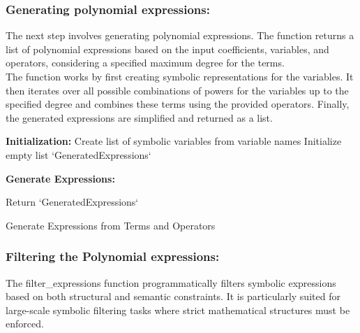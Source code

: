\documentclass{article}
\begin{document}
\subsubsection{Generating polynomial expressions:}

The next step involves generating polynomial expressions. The function returns a list of polynomial expressions based on the input coefficients, variables, and operators, considering a specified maximum degree for the terms.\\

The function works by first creating symbolic representations for the variables. It then iterates over all possible combinations of powers for the variables up to the specified degree and combines these terms using the provided operators. Finally, the generated expressions are simplified and returned as a list.\\



\begin{algorithm}[H]
\SetAlgoLined
{}

\textbf{Initialization:}\;
Create list of symbolic variables from variable names\;
Initialize empty list `GeneratedExpressions`\;

\textbf{Generate Expressions:}\;

Return `GeneratedExpressions`\;

\caption{Generate Expressions from Terms and Operators}
\label{alg:generate_expressions_terms} %
\end{algorithm}




\subsubsection{Filtering the Polynomial expressions:}

The filter\_expressions function programmatically filters symbolic expressions based on both structural and semantic constraints. It is particularly suited for large-scale symbolic filtering tasks where strict mathematical structures must be enforced.\\
\end{document}
